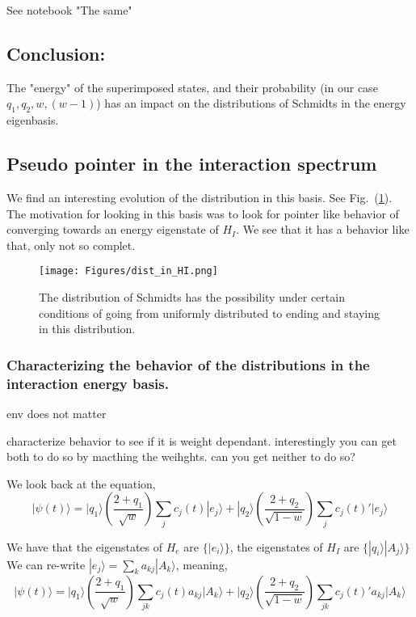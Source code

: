 \documentclass{article}
\begin{document}
{\color{teal} See notebook "The same"}\\
\subsection{Conclusion:}
{\color{teal} The "energy" of the superimposed states, and their probability (in our case $q_1,q_2,w,(w-1)$) has an impact on the distributions of Schmidts in the energy eigenbasis.}


\subsection{Pseudo pointer in the interaction spectrum}

We find an interesting evolution of the distribution in this basis. See Fig.~(\ref{fig:dis_in_HI}). The motivation for looking in this basis was to look for pointer like behavior of converging towards an energy eigenstate of $H_I$. We see that it has a behavior like that, only not so complet.

\begin{figure}
    \centering
    \texttt{[image: Figures/dist\_in\_HI.png]}
    \caption{The distribution of Schmidts has the possibility under certain conditions of going from uniformly distributed to ending and staying in this distribution.}
    \label{fig:dis_in_HI}
\end{figure}

\subsubsection{Characterizing the behavior of the distributions in the interaction energy basis.}


env does not matter



characterize behavior to see if it is weight dependant. 
interestingly you can get both to do so by macthing the weihghts. can you get neither to do so?

We look back at the equation,
\begin{equation}
    |\psi(t)\rangle=|q_1\rangle(\frac{2+q_1}{\sqrt{w}})\sum_jc_j(t)|e_j\rangle+|q_2\rangle(\frac{2+q_2}{\sqrt{1-w}})\sum_jc_j(t)'|e_j\rangle
\end{equation}

We have that the eigenstates of $H_e$ are $\{|e_i\rangle\}$, the eigenstates of $H_I$ are $\{|q_i\rangle|A_j\rangle\}$ We can re-write $ |e_j\rangle= \sum_ka_{kj}|A_k\rangle$, meaning,
\begin{equation}
    |\psi(t)\rangle=|q_1\rangle(\frac{2+q_1}{\sqrt{w}})\sum_{jk}c_j(t)a_{kj}|A_k\rangle+|q_2\rangle(\frac{2+q_2}{\sqrt{1-w}})\sum_{jk}c_j(t)'a_{kj}|A_k\rangle
\end{equation}
\end{document}
